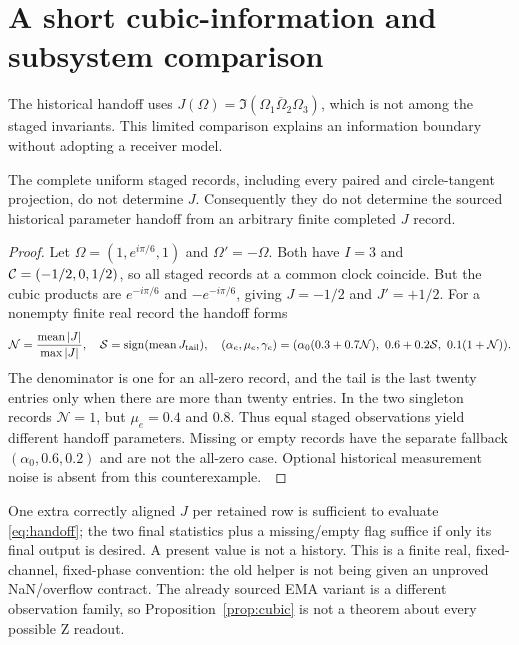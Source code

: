 \section{A short cubic-information and subsystem comparison}\label{sec:cubic}
The historical handoff uses $J(\Omega)=\Im(\Omega_1\overline\Omega_2\Omega_3)$, which is not among the staged invariants. This limited comparison explains an information boundary without adopting a receiver model.

\begin{proposition}\label{prop:cubic}
The complete uniform staged records, including every paired and circle-tangent projection, do not determine $J$. Consequently they do not determine the sourced historical parameter handoff from an arbitrary finite completed $J$ record.
\end{proposition}
\begin{proof}
Let $\Omega=(1,e^{i\pi/6},1)$ and $\Omega'=-\Omega$. Both have $I=3$ and $\mathcal C=(-1/2,0,1/2)$, so all staged records at a common clock coincide. But the cubic products are $e^{-i\pi/6}$ and $-e^{-i\pi/6}$, giving $J=-1/2$ and $J'=+1/2$. For a nonempty finite real record the handoff forms
\begin{equation}\label{eq:handoff}
\mathcal N=\frac{\operatorname{mean}|J|}{\max|J|},\quad
\mathcal S=\operatorname{sign}(\operatorname{mean}J_{\rm tail}),\quad
(\alpha_e,\mu_e,\gamma_e)=
(\alpha_0(0.3+0.7\mathcal N),\ 0.6+0.2\mathcal S,\ 0.1(1+\mathcal N)).
\end{equation}
The denominator is one for an all-zero record, and the tail is the last twenty entries only when there are more than twenty entries. In the two singleton records $\mathcal N=1$, but $\mu_e=0.4$ and $0.8$. Thus equal staged observations yield different handoff parameters. Missing or empty records have the separate fallback $(\alpha_0,0.6,0.2)$ and are not the all-zero case. Optional historical measurement noise is absent from this counterexample.~\cite{Historical,SRG03}
\end{proof}

One extra correctly aligned $J$ per retained row is sufficient to evaluate \eqref{eq:handoff}; the two final statistics plus a missing/empty flag suffice if only its final output is desired. A present value is not a history. This is a finite real, fixed-channel, fixed-phase convention: the old helper is not being given an unproved NaN/overflow contract. The already sourced EMA variant is a different observation family, so Proposition~\ref{prop:cubic} is not a theorem about every possible Z readout.

